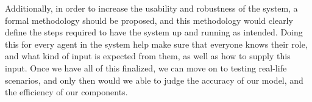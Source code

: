 Additionally, in order to increase the usability and robustness of the system, a formal methodology should be proposed, and this methodology would clearly define the steps required to have the system up and running as intended. Doing this for every agent in the system help make sure that everyone knows their role, and what kind of input is expected from them, as well as how to supply this input. Once we have all of this finalized, we can move on to testing real-life scenarios, and only then would we able to judge the accuracy of our model, and the efficiency of our components.
